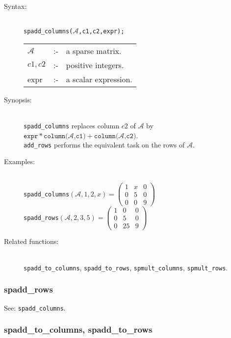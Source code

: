 \begin{description}
\item[Syntax:]\mbox{}\\
\texttt{spadd\_columns($\mathcal{A}$,c1,c2,expr);}

\begin{tabular}{l l l}
$\mathcal{A}$ & :- & a sparse matrix. \\
$c1,c2$      & :- & positive integers. \\
expr       & :- & a scalar expression.
\end{tabular}

\item[Synopsis:]\mbox{}\\
\texttt{spadd\_columns} replaces column $c2$ of $\mathcal{A}$ by\\
$\texttt{expr} * \texttt{column($\mathcal{A}$,c1)} + \texttt{column($\mathcal{A}$,c2)}$.\\
\texttt{add\_rows} performs the equivalent task on the rows of $\mathcal{A}$.

\item[Examples:]\mbox{}\\
\texttt{spadd\_columns}\((\mathcal{A},1,2,x)  =
  \begin{pmatrix} 1 & x & 0 \\ 0 & 5 & 0 \\ 0 & 0 & 9 \end{pmatrix}\) \\[2mm]
\texttt{spadd\_rows}\((\mathcal{A},2,3,5)  =
\begin{pmatrix} 1 & 0 & 0 \\ 0 & 5 & 0 \\ 0 & 25 & 9 \end{pmatrix}\)

\item[Related functions:]\mbox{}\\
\texttt{spadd\_to\_columns}, \texttt{spadd\_to\_rows},
\texttt{spmult\_columns}, \texttt{spmult\_rows}.
\end{description}

\subsubsection{spadd\_rows}
\label{sparse:spadd_rows}
\hypertarget{operator:SPADD_ROWS}{}

See: \texttt{spadd\_columns}.


\subsubsection{spadd\_to\_columns, spadd\_to\_rows}
\label{sparse:spadd_to_columns}
\hypertarget{operator:SPADD_TO_COLUMNS}{}

